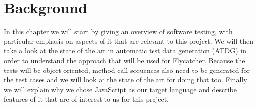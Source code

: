 \documentclass[a4paper,11pt,titlepage]{report}
\begin{document}


\chapter{Background}
In this chapter we will start by giving an overview of software testing, with particular emphasis on aspects of it that are relevant to this project. We will then take a look at the state of the art in automatic test data generation (ATDG) in order to understand the approach that will be used for Flycatcher. Because the tests will be object-oriented, method call sequences also need to be generated for the test cases and we will look at the state of the art for doing that too. Finally we will explain why we chose JavaScript as our target language and describe features of it that are of interest to us for this project.
\end{document}
